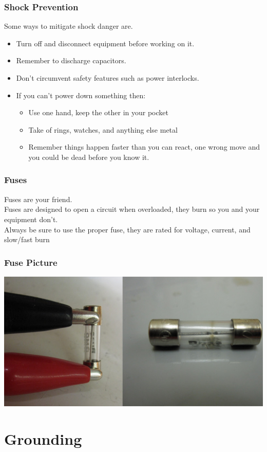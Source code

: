 \documentclass[10pt, handout]{beamer}
\begin{document}
\begin{frame}
\frametitle{Shock Prevention}
Some ways to mitigate shock danger are.\\
\begin{itemize}
\item Turn off and disconnect equipment before working on it.
\item Remember to discharge capacitors.
\item Don't circumvent safety features such as power interlocks.
\item If you can't power down something then:
\begin{itemize}
\item Use one hand, keep the other in your pocket
\item Take of rings, watches, and anything else metal
\item Remember things happen faster than you can react, one wrong move and you could be dead before you know it.
\end{itemize}
\end{itemize}
\end{frame}


\begin{frame}
\frametitle{Fuses}
Fuses are your friend.\\
Fuses are designed to open a circuit when overloaded, they burn so you and your equipment don't.\\
Always be sure to use the proper fuse, they are rated for voltage, current, and slow/fast burn
\end{frame}

\begin{frame}
\frametitle{Fuse Picture}
\includegraphics[width=\textwidth]{fuse.jpg}
\end{frame}

\section{Grounding}
\end{document}
